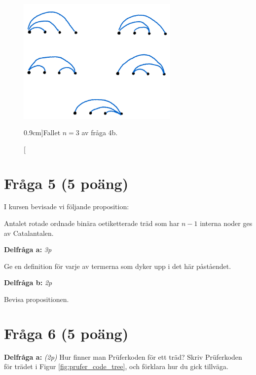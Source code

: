 \documentclass[nobib]{tufte-handout}
\begin{document}
\begin{figure}
  \centering
  \includegraphics[width=0.7\textwidth]{graphics/catalan_exercise_part2_figure.png}
  \caption[][0.9cm]{Fallet $n=3$ av fråga 4b.}
  \label{fig:q4b}
\end{figure}



\section{Fråga 5 (5 poäng)} %

I kursen bevisade vi följande proposition:

\begin{proposition}
  Antalet rotade ordnade binära oetiketterade träd som har $n-1$ interna noder ges av Catalantalen.
\end{proposition}

\textbf{Delfråga a:} \emph{3p}

Ge en definition för varje av termerna som dyker upp i det här påståendet.

\textbf{Delfråga b:} \emph{2p}

Bevisa propositionen.

\section{Fråga 6 (5 poäng)} %

\textbf{Delfråga a:} \emph{(2p)} Hur finner man Prüferkoden för ett träd? Skriv Prüferkoden för trädet i Figur \ref{fig:prufer_code_tree}, och förklara hur du gick tillväga.
\end{document}
